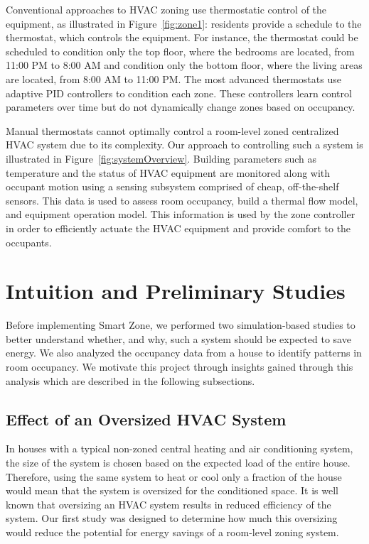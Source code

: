 Conventional approaches to HVAC zoning use thermostatic control of the
equipment, as illustrated in Figure~\ref{fig:zone1}: residents provide a
schedule to the thermostat, which controls the equipment. For instance, the
thermostat could be scheduled to condition only the top floor, where the
bedrooms are located, from 11:00 PM to 8:00 AM and condition only the bottom
floor, where the living areas are located, from 8:00 AM to 11:00 PM. The most
advanced thermostats use adaptive PID controllers to condition each zone. These
controllers learn control parameters over time but do not dynamically change
zones based on occupancy. 

Manual thermostats cannot optimally control a room-level zoned centralized HVAC
system due to its complexity. Our approach to controlling such a system is
illustrated in Figure~\ref{fig:systemOverview}. Building parameters such as
temperature and the status of HVAC equipment are monitored along with occupant
motion using a sensing subsystem comprised of cheap, off-the-shelf sensors. This
data is used to assess room occupancy, build a thermal flow model, and equipment
operation model. This information is used by the zone controller in order to
efficiently actuate the HVAC equipment and provide comfort to the occupants. 

\section{Intuition and Preliminary Studies}
Before implementing Smart Zone, we performed two simulation-based studies to
better understand whether, and why, such a system should be expected to save
energy. We also analyzed the occupancy data from a house to identify patterns in
room occupancy. We motivate this project through insights gained through this
analysis which are described in the following subsections.

\subsection{Effect of an Oversized HVAC System}
In houses with a typical non-zoned central heating and air conditioning system,
the size of the system is chosen based on the expected load of the entire
house. Therefore, using the same system to heat or cool only a fraction of the
house would mean that the system is oversized for the conditioned space. It is
well known that oversizing an HVAC system results in reduced efficiency of the
system. Our first study was designed to determine how much this oversizing would
reduce the potential for energy savings of a room-level zoning system.

